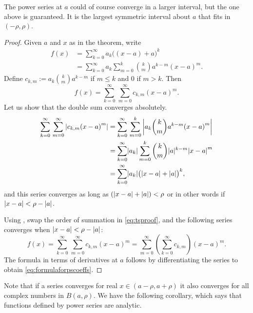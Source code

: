 The power series at $a$ could of course converge in a larger interval, but
the one above is guaranteed.  It is the largest symmetric interval about
$a$ that fits in $(-\rho,\rho)$.

\begin{proof}
Given $a$ and $x$ as in the theorem,
write
\begin{equation*}
\begin{split}
f(x) &= \sum_{k=0}^\infty a_k {\bigl((x-a)+a\bigr)}^k \\
&= \sum_{k=0}^\infty a_k \sum_{m=0}^k \binom{k}{m} a^{k-m} {(x-a)}^m .
\end{split}
\end{equation*}
Define $c_{k,m} := a_k \binom{k}{m} a^{k-m}$ if $m \leq k$ and $0$ if $m >
k$.  Then 
\begin{equation} \label{eq:tsproof}
f(x) = \sum_{k=0}^\infty \, \sum_{m=0}^\infty c_{k,m} {(x-a)}^m .
\end{equation}
Let us show that the double sum converges absolutely.
\begin{equation*}
\begin{split}
\sum_{k=0}^\infty \, \sum_{m=0}^\infty \left\lvert { c_{k,m} {(x-a)}^m} \right\rvert
& = \sum_{k=0}^\infty \, \sum_{m=0}^k \left\lvert { a_k \binom{k}{m} a^{k-m} {(x-a)}^m } \right\rvert
\\
& = \sum_{k=0}^\infty \lvert {a_k} \rvert \sum_{m=0}^k \binom{k}{m} \lvert {a} \rvert^{k-m}
{\lvert {x-a} \rvert}^m  \\
& = \sum_{k=0}^\infty \lvert {a_k} \rvert {\bigl(\lvert {x-a} \rvert+\lvert {a} \rvert\bigr)}^k ,
\end{split}
\end{equation*}
and this series converges as long as 
$(\lvert {x-a} \rvert+\lvert {a} \rvert) < \rho$ or in other words if
$\lvert {x-a} \rvert < \rho-\lvert {a} \rvert$.

Using ,
swap the order of summation in \eqref{eq:tsproof}, and 
the following series converges when $\lvert {x-a} \rvert < \rho-\lvert {a} \rvert$:
\begin{equation*}
f(x) =
\sum_{k=0}^\infty \, \sum_{m=0}^\infty c_{k,m} {(x-a)}^m
=
\sum_{m=0}^\infty
\left( \sum_{k=0}^\infty
c_{k,m} \right) {(x-a)}^m .
\end{equation*}
The formula in terms of derivatives at $a$ follows by
differentiating the series to obtain \eqref{eq:formulaforpscoeffs}.
\end{proof}

Note that if a series converges for real $x \in (a-\rho,a+\rho)$ it also converges
for all complex numbers in $B(a,\rho)$.
We have the following corollary, which says that functions defined
by power series are analytic.

